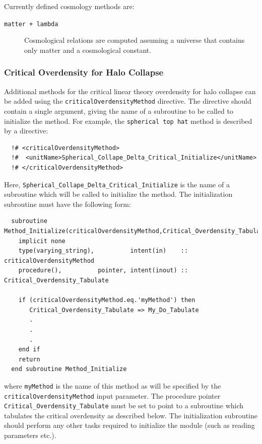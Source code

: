 Currently defined cosmology methods are:
\begin{description}
 \item [{\tt matter + lambda}] Cosmological relations are computed assuming a universe that contains only matter and a cosmological constant.
\end{description}

\subsubsection{Critical Overdensity for Halo Collapse}

Additional methods for the critical linear theory overdensity for halo collapse can be added using the {\tt criticalOverdensityMethod} directive. The directive should contain a single argument, giving the name of a subroutine to be called to initialize the method. For example, the {\tt spherical top hat} method is described by a directive:
\begin{verbatim}
  !# <criticalOverdensityMethod>
  !#  <unitName>Spherical_Collape_Delta_Critical_Initialize</unitName>
  !# </criticalOverdensityMethod>
\end{verbatim}
Here, {\tt Spherical\_Collape\_Delta\_Critical\_Initialize} is the name of a subroutine which will be called to initialize the method. The initialization subroutine must have the following form:
\begin{verbatim}
  subroutine Method_Initialize(criticalOverdensityMethod,Critical_Overdensity_Tabulate)
    implicit none
    type(varying_string),          intent(in)    :: criticalOverdensityMethod
    procedure(),          pointer, intent(inout) :: Critical_Overdensity_Tabulate
    
    if (criticalOverdensityMethod.eq.'myMethod') then
       Critical_Overdensity_Tabulate => My_Do_Tabulate
       .
       .
       .
    end if
    return
  end subroutine Method_Initialize
\end{verbatim}
where {\tt myMethod} is the name of this method as will be specified by the {\tt criticalOverdensityMethod} input parameter. The procedure pointer {\tt Critical\_Overdensity\_Tabulate} must be set to point to a subroutine which tabulates the critical overdensity as described below. The initialization subroutine should perform any other tasks required to initialize the module (such as reading parameters etc.).

